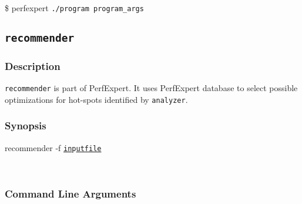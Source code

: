 \vspace{10pt}
\$ \btt perfexpert  \tt{./program  program\_args}\par
\normalfont
\vspace{10pt}


\subsection{\texttt{recommender}} \label{recommender}

\subsubsection{Description}

\texttt{recommender} is part of PerfExpert. It uses PerfExpert database to select possible optimizations for hot-spots identified by \texttt{analyzer}.

     
\subsubsection{Synopsis}

\btt recommender -f \tt\underline{in}p\underline{utfile} \par
\ \ \ \ \ \ \ \ \ \normalfont

\subsubsection{Command Line Arguments}

